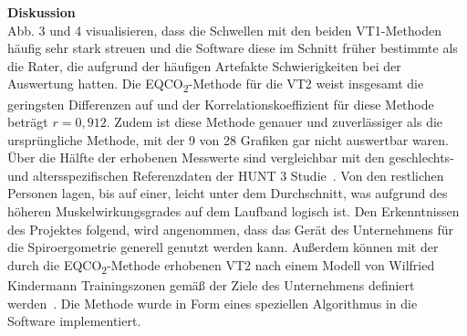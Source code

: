 \textbf{\Large Diskussion}\\

Abb. 3 und 4 visualisieren, dass die Schwellen mit den beiden VT1-Methoden häufig sehr stark streuen und die Software diese im Schnitt früher bestimmte als die Rater, die aufgrund der häufigen Artefakte Schwierigkeiten bei der Auswertung hatten. Die EQCO\textsubscript{2}-Methode für die VT2 weist insgesamt die geringsten Differenzen auf und der Korrelationskoeffizient für diese Methode beträgt $r = 0,912$. Zudem ist diese Methode genauer und zuverlässiger als die ursprüngliche Methode, mit der 9 von 28 Grafiken gar nicht auswertbar waren.\\
Über die Hälfte der erhobenen Messwerte sind vergleichbar mit den geschlechts- und altersspezifischen Referenzdaten der HUNT 3 Studie~\cite{Loe.2014}. Von den restlichen Personen lagen, bis auf einer, leicht unter dem Durchschnitt, was aufgrund des höheren Muskelwirkungsgrades auf dem Laufband logisch ist. Den Erkenntnissen des Projektes folgend, wird angenommen, dass das Gerät des Unternehmens für die Spiroergometrie generell genutzt werden kann. Außerdem können mit der durch die EQCO\textsubscript{2}-Methode erhobenen VT2 nach einem Modell von Wilfried Kindermann Trainingszonen gemäß der Ziele des Unternehmens definiert werden~\cite{Kindermann.2004}. Die Methode wurde in Form eines speziellen Algorithmus in die Software implementiert.